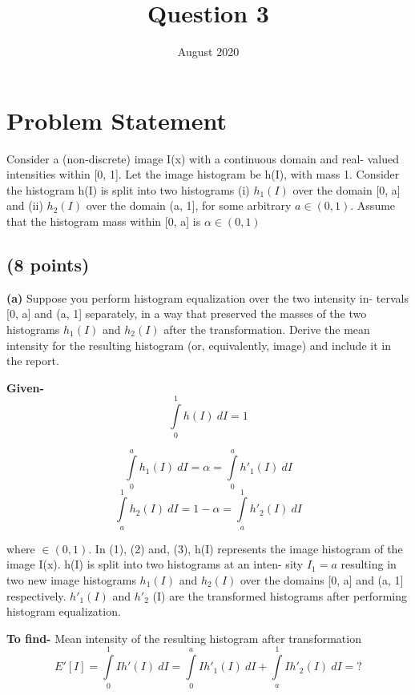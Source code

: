 \documentclass{article}
\title{Question 3}
\author{ }
\date{August 2020}
\begin{document}
\maketitle

\section{Problem Statement }

Consider a (non-discrete) image I(x) with a continuous domain and real-
valued intensities within [0, 1]. Let the image histogram be h(I), with mass
1. Consider the histogram h(I) is split into two histograms (i) $h_1 (I)$ over the
domain [0, a] and (ii) $h_2 (I)$ over the domain (a, 1], for some arbitrary $a \in (0,
1)$. Assume that the histogram mass within [0, a] is $\alpha \in (0, 1)$

\subsection{(8 points)}
\textbf{(a)} Suppose you perform histogram equalization over the two intensity in-
tervals [0, a] and (a, 1] separately, in a way that preserved the masses of the
two histograms $h_1 (I)$ and $h_2 (I)$ after the transformation. Derive the mean
intensity for the resulting histogram (or, equivalently, image) and include it
in the report.

\textbf{Given-}
\begin{equation}
\int\limits_0^1 h(I) \ dI =1 
\end{equation}
 
\begin{equation} \int\limits_0^a h_1(I) \ dI =\alpha = \int\limits_0^a h'_1(I) \ dI \end{equation} 
\begin{equation} \int\limits_a^1 h_2(I) \ dI =1-\alpha = \int\limits_a^1 h'_2(I) \ dI \end{equation} 

where $ \in (0, 1)$. In (1), (2) and, (3), h(I) represents the image
histogram of the image I(x). h(I) is split into two histograms at an inten-
sity $I_1 = a$ resulting in two new image histograms $h_1 (I)$ and $h_2 (I)$ over the
domains [0, a] and (a, 1] respectively. $h'_1 (I)$ and $h'_2$  (I) are the transformed
histograms after performing histogram equalization.

\textbf{To find-} Mean intensity of the resulting histogram after transformation
\begin{equation}E'[I] =  \int\limits_0^1 I h'(I) \ dI = \int\limits_0^a I h'_1(I) \ dI + \int\limits_a^1 I h'_2(I) \ dI = ?\end{equation}
\end{document}
